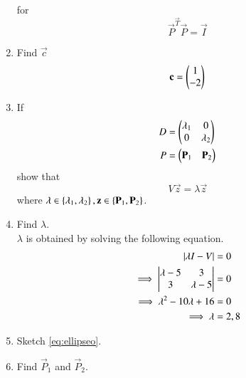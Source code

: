 \begin{enumerate}[label=\arabic*.,ref=\thesubsection.\theenumi]
for 
\begin{equation}
\vec{P}^\vec{T}\vec{P} = \vec{I}
\label{eq:ellipse_trans}
\end{equation}
\item Find $\vec{c}$
\\
\solution 
\begin{align}
\mathbf{c} = \begin{pmatrix}1 \\ -2\end{pmatrix}
\end{align}
\item If 
\begin{align}
D &= \begin{pmatrix}\lambda_1 & 0 \\ 0 & \lambda_2 \end{pmatrix}
\\
P &= \begin{pmatrix}\mathbf{P}_1 & \mathbf{P}_2 \end{pmatrix}
\label{eq:ellipse_eigmat}
\end{align}
show that 
\begin{equation}
V\vec{z} = \lambda \vec{z}
\label{eq:ellipse_eig}
\end{equation}
%
where $\lambda \in \left\{\lambda_1, \lambda_2\right\}, \mathbf{z}\in\left\{ \mathbf{P}_1, \mathbf{P}_2\right\}$.
\item Find $\lambda$.
\\
\solution $\lambda$ is obtained by solving the following equation.
\begin{align}
\left\vert\lambda I-V\right\vert &= 0
\label{eq:ellipse_ceq}
\\
\implies\begin{vmatrix}\lambda -5 & 3 \\ 3 & \lambda -5\end{vmatrix} & = 0
\\
\implies \lambda^2 -10 \lambda+ 16 &= 0
\\
\implies \lambda &= 2, 8
\end{align}
\item Sketch \ref{eq:ellipseo}.
\item Find $\vec{P}_1$ and $\vec{P}_2$.
\\

\end{enumerate}
